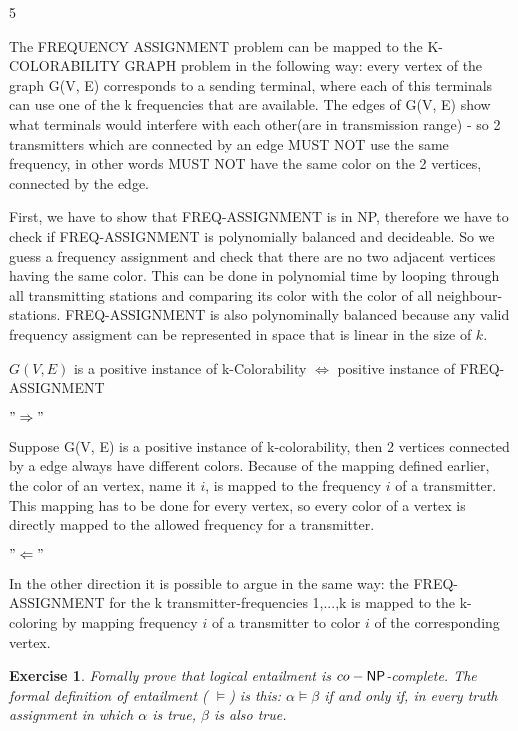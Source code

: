 \documentclass [11pt]{article}
\newtheorem{exercise}[theorem]{Exercise}
\newcommand{\ccfont}[1]{\protect\mathsf{#1}}
\newcommand{\NP}{\ccfont{NP}}
\newcommand{\solution}[1]{\noindent {\bf Solution.}  #1}
\begin{document}
\solution{ 5}

The FREQUENCY ASSIGNMENT problem can be mapped to the K-COLORABILITY GRAPH problem in the following way: every vertex of the graph G(V, E) corresponds to a sending terminal, where each of this terminals can use one of the k frequencies that are available. The edges of G(V, E) show what terminals would interfere with each other(are in transmission range) - so 2 transmitters which are connected by  an edge MUST NOT use the same frequency, in other words MUST NOT have the same color on the 2 vertices, connected by the edge.

First, we have to show that FREQ-ASSIGNMENT is in NP, therefore we have to check if FREQ-ASSIGNMENT is polynomially balanced and decideable. So we guess a frequency assignment and check that there are no two adjacent vertices having the same color. This can be done in polynomial time by looping through all transmitting stations and comparing its color with the color of all neighbour-stations. FREQ-ASSIGNMENT is also polynominally balanced because any valid frequency assigment can be represented in space that is linear in the size of $k$.

\medskip

 $G(V, E)$ is a positive instance of k-Colorability $\Leftrightarrow$ positive instance of FREQ-ASSIGNMENT

$ "\Rightarrow" $

Suppose G(V, E) is a positive instance of k-colorability, then 2 vertices connected by a edge always have different colors. Because of the mapping defined earlier, the color of an vertex, name it $i$, is mapped to the frequency $i$ of a transmitter. This mapping has to be done for every vertex, so every color of a vertex is directly mapped to the allowed frequency for a transmitter.

\medskip

$ "\Leftarrow" $

In the other direction it is possible to argue in the same way: the FREQ-ASSIGNMENT for the k transmitter-frequencies {1,...,k} is mapped to the k-coloring by mapping frequency $i$ of a transmitter to color $i$ of the corresponding vertex.

\begin{exercise}
  \label{ex:CO-NP}
  Fomally prove that logical entailment is $co-\NP$-complete. The formal definition of entailment ( $\models$) is this: $\alpha \models \beta$ if and only if, in every truth assignment in which $\alpha$ is true, $\beta$ is also true.  
\end{exercise}
\end{document}
